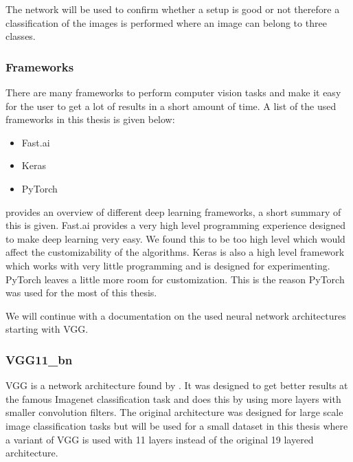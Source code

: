 		The network will be used to confirm whether a setup is good or not therefore a classification of the images is performed where an image can belong to three classes. 

	
	\subsubsection{Frameworks}
	
		There are many frameworks to perform computer vision tasks and make it easy for the user to get a lot of results in a short amount of time. A list of the used frameworks in this thesis is given below:
		\begin{itemize}
		\item Fast.ai  \citep{fastai} 
		\item Keras \citep{keras} 
		\item PyTorch \citep{pytorch} 
		\end{itemize}
		
		\cite{basnet2019towards} provides an overview of different deep learning frameworks, a short summary of this is given.
		Fast.ai provides a very high level programming experience designed to make deep learning very easy. We found this to be too high level which would affect the customizability of the algorithms.
		Keras is also a high level framework which works with very little programming and is designed for experimenting. 
		PyTorch leaves a little more room for customization. This is the reason PyTorch was used for the most of this thesis. 
		
		
		We will continue with a documentation on the used neural network architectures starting with VGG.
		
	
			\subsubsection{VGG11\_bn}
		VGG is a network architecture found by \cite{Simonyan2015}. It was designed to get better results at the famous Imagenet classification task and does this by using more layers with smaller convolution filters. The original architecture was designed for large scale image classification tasks but will be used for a small dataset in this thesis where a variant of VGG is used with 11 layers instead of the original 19 layered architecture.
		
